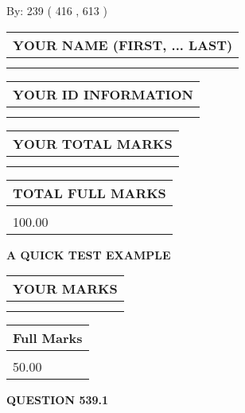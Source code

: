 \documentclass[12pt]{article}
\begin{document}
   
\hspace{1.0in} By: 
 239 ( 416 ,  613 )
   
   
   
   
\newpage 
\setcounter{page}{ 
   539001 } 
   
   
   
   
\noindent\begin{tabular}{|l|}
\hline
YOUR NAME (FIRST, ... LAST)  \\
\hline
 \\ 
 \\ 
\hline
\end{tabular}
\hspace{0.05in} \begin{tabular}{|l|}
\hline
 YOUR   ID   INFORMATION  \\
\hline
 \\ 
 \\ 
\hline
\end{tabular}
   
   
\vspace{0.2in}\noindent\begin{tabular}{|l|}
\hline
YOUR TOTAL MARKS  \\
\hline
 \\ 
 \\ 
\hline
\end{tabular}
\hspace{0.05in} \begin{tabular}{|l|}
\hline
TOTAL FULL MARKS  \\
\hline
 \\ 
100.00 \\
\hline
\end{tabular}
   
   
 \vspace{0.2in}
{\LARGE {\textbf{ A QUICK TEST EXAMPLE}}}
   
   
  
\vspace{0.2in}
  
\noindent\begin{tabular}{|l|}
\hline
 YOUR MARKS  \\
\hline
 \\ 
 \\ 
\hline
\end{tabular}
\hspace{0.05in} \begin{tabular}{|l|}
\hline
 Full Marks  \\
\hline
 \\ 
50.00 \\
\hline
\end{tabular}
{\textbf{\Large{QUESTION
539.1 
}}}
  
\end{document}
